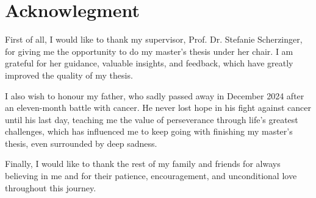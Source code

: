 
\thispagestyle{plain}

\section*{Acknowlegment}
First of all, I would like to thank my supervisor, Prof. Dr. Stefanie Scherzinger, for giving me the opportunity to do my master's thesis under her chair. I am grateful for her guidance, valuable insights, and feedback, which have greatly improved the quality of my thesis.

I also wish to honour my father, who sadly passed away in December 2024 after an eleven-month battle with cancer. He never lost hope in his fight against cancer until his last day, teaching me the value of perseverance through life's greatest challenges, which has influenced me to keep going with finishing my master's thesis, even surrounded by deep sadness.

Finally, I would like to thank the rest of my family and friends for always believing in me and for their patience, encouragement, and unconditional love throughout this journey.